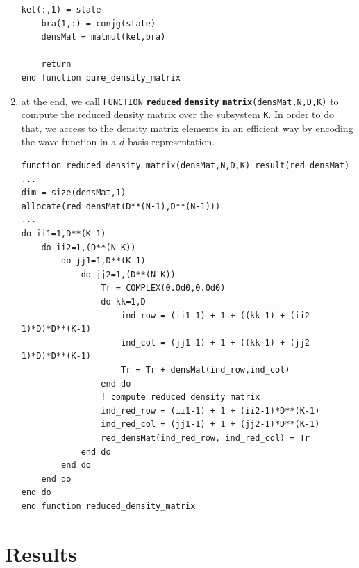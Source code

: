 \documentclass[rmp,10pt,onecolumn,fleqn,notitlepage]{revtex4-1}
\begin{document}
\begin{enumerate}
\begin{minipage}[t]{0.55\linewidth}
\begin{lstlisting}[style=Fortran]
    ket(:,1) = state
    bra(1,:) = conjg(state)
    densMat = matmul(ket,bra)

    return
end function pure_density_matrix\end{lstlisting}
\end{minipage}

\item at the end, we call \texttt{FUNCTION} {\bfseries\texttt{reduced$\_$density$\_$matrix}}\texttt{(densMat,N,D,K)} to compute the reduced density matrix over the subsystem \texttt{K}. In order to do that, we access to the density matrix elements in an efficient way by encoding the wave function in a $d$-basis representation.

\begin{minipage}[t]{0.75\linewidth}%
\begin{lstlisting}[style=Fortran]
function reduced_density_matrix(densMat,N,D,K) result(red_densMat)
...
dim = size(densMat,1)
allocate(red_densMat(D**(N-1),D**(N-1)))
...
do ii1=1,D**(K-1)
    do ii2=1,(D**(N-K))
        do jj1=1,D**(K-1)
            do jj2=1,(D**(N-K))
                Tr = COMPLEX(0.0d0,0.0d0)
                do kk=1,D
                    ind_row = (ii1-1) + 1 + ((kk-1) + (ii2-1)*D)*D**(K-1)
                    ind_col = (jj1-1) + 1 + ((kk-1) + (jj2-1)*D)*D**(K-1)
                    Tr = Tr + densMat(ind_row,ind_col)
                end do
                ! compute reduced density matrix
                ind_red_row = (ii1-1) + 1 + (ii2-1)*D**(K-1)
                ind_red_col = (jj1-1) + 1 + (jj2-1)*D**(K-1)
                red_densMat(ind_red_row, ind_red_col) = Tr
            end do
        end do
    end do
end do
end function reduced_density_matrix\end{lstlisting}
\end{minipage}

\end{enumerate}



\section{Results}
\end{document}
